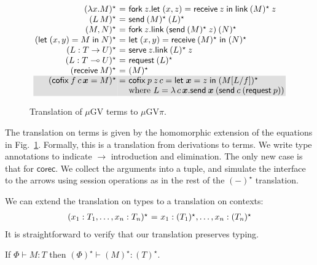 \documentclass[orivec,envcountsame]{llncs}
\makeatletter
\newcommand{\gvdual}[1]{\overline{#1}}
\newcommand{\lto}{\ensuremath{\multimap}}
\newcommand{\uto}{\ensuremath{\rightarrow}}
\newcommand{\outterm}{\mathrm{end}_!}
\newcommand{\gvtyp}[3]{#1 \vdash #2 : #3}
\newcommand{\mkwd}[1]{\mathsf{#1}}
\newcommand{\gvsend}[2]{\mkwd{send}\:#1\:#2}
\newcommand{\gvreceive}[1]{\mkwd{receive}\:#1}
\newcommand{\gvlet}[3]{\mkwd{let}\;#1 = #2\;\mkwd{in}\;#3}
\newcommand{\gvlink}[2]{\mkwd{link}\:#1\:#2}
\newcommand{\gvfork}[2]{\mkwd{fork}\:#1.#2}
\newcommand{\lrkwd}{\mkwd{cofix}}
\newcommand{\gvfix}[3]{\lrkwd\:#1\:#2 = #3}
\newcommand{\gvserve}[2]{\mkwd{serve}\:#1.#2}
\newcommand{\gvrequest}[1]{\mkwd{request}\:#1}
\newcommand{\key}{\mkwd}
\newcommand{\topi}[1]{({#1})^\star}
\newcommand{\mugv}{$\mu\mathrm{GV}$\xspace}
\newcommand{\gvpi}{$\mu\mathrm{GV}\pi$\xspace}
\newcommand{\ba}{\begin{array}}
\newcommand{\ea}{\end{array}}
\newenvironment{equations}{\[\ba{@{}r@{~}c@{~}l@{}}}{\ea\]}
\newcommand\shaderow{\noalign{\vskip-0.4pt}\rowcolor{shade}[0.6mm]}
\makeatother
\begin{document}
\begin{figure}[float]\small
\begin{equations}
\topi{\lambda x.M} &=& \gvfork{z}{\gvlet{(x, z)}{\gvreceive{z}}{\gvlink{\topi{M}}{z}}} \\
\topi{L\,M} &=& \gvsend{\topi{M}}{\topi{L}} \\
\topi{M, N} &=&
  \gvfork{z}
    {\gvlink{(\gvsend{\topi{M}}{z})}{\topi{N}}} \\
\topi{\gvlet{(x, y)}{M}{N}} &=&
    \gvlet{(x, y)}{\gvreceive{\topi{M}}}{\topi{N}} \\
\topi{L : T \uto U} &=&
  \gvserve{z}{\gvlink{\topi{L}}{z}} \\
\topi{L : T \lto U} &=& \gvrequest{\topi{L}} \\
\topi{\gvreceive{M}} &=& \topi{M}
\\ \shaderow
\topi{\gvfix{f}{c\,\vec{x}}{M}} &=&
  \gvfix{p}{z\,c}{\gvlet{\vec{x}}{z}{\topi{M[L/f]}}} \\ \shaderow
&& \text{where }L = \lambda\,c\,\vec{x}.\gvsend{\vec{x}}{(\gvsend{c}{(\gvrequest{p})})} \\
\end{equations}%
\caption{Translation of \mugv terms to \gvpi.}\label{fig:togvpi}
\end{figure}

The translation on terms is given by the homomorphic extension of the equations in
Fig.~\ref{fig:togvpi}.  Formally, this is a translation from derivations to terms. We write type
annotations to indicate $\to$ introduction and elimination.
%
The only new case is that for $\key{corec}$. We collect the arguments into a tuple, and simulate the
interface to the arrows using session operations as in the rest of the $\topi{-}$ translation.

We can extend the translation on types to a translation on contexts:
\begin{equations}
\topi{x_1:T_1, \dots, x_n:T_n} &=& x_1:\topi{T_1}, \dots, x_n:\topi{T_n} \\
\end{equations}%
It is straightforward to verify that our translation preserves typing.
\begin{theorem}
If $\gvtyp{\Phi}{M}{T}$ then $\gvtyp{\topi{\Phi}}{\topi{M}}{\topi{T}}$.
\end{theorem}
\end{document}
